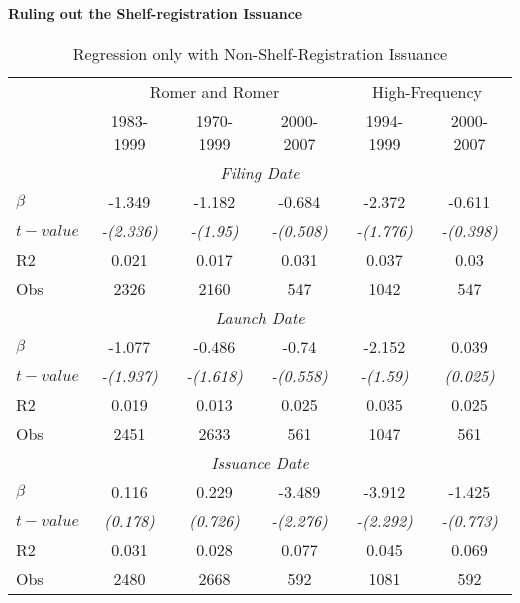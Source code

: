 \documentclass[11pt]{article}
\begin{document}
\paragraph{Ruling out the Shelf-registration Issuance}
\begin{table}[htbp]
	\centering
	\caption{Regression only with Non-Shelf-Registration Issuance}
	\begin{tabular}{lccccc}
		\toprule
		& \multicolumn{3}{c}{Romer and Romer} & \multicolumn{2}{c}{High-Frequency} \\
		& 1983-1999 & 1970-1999 & 2000-2007 & 1994-1999 & 2000-2007 \\
		\midrule
		\multicolumn{6}{c}{\textit{Filing Date}} \\
		$ \beta $ & -1.349 & -1.182 & -0.684 & -2.372 & -0.611 \\
		$ t-value $ & \textit{-(2.336)} & \textit{-(1.95)} & \textit{-(0.508)} & \textit{-(1.776)} & \textit{-(0.398)} \\
		R2    & 0.021 & 0.017 & 0.031 & 0.037 & 0.03 \\
		Obs   & 2326  & 2160  & 547   & 1042  & 547 \\
		\midrule
		\multicolumn{6}{c}{\textit{Launch Date}} \\
		$ \beta $ & -1.077 & -0.486 & -0.74 & -2.152 & 0.039 \\
		$ t-value $ & \textit{-(1.937)} & \textit{-(1.618)} & \textit{-(0.558)} & \textit{-(1.59)} & \textit{(0.025)} \\
		R2    & 0.019 & 0.013 & 0.025 & 0.035 & 0.025 \\
		Obs   & 2451  & 2633  & 561   & 1047  & 561 \\
		\midrule
		\multicolumn{6}{c}{\textit{Issuance Date}} \\
		$ \beta $ & 0.116 & 0.229 & -3.489 & -3.912 & -1.425 \\
		$ t-value $ & \textit{(0.178)} & \textit{(0.726)} & \textit{-(2.276)} & \textit{-(2.292)} & \textit{-(0.773)} \\
		R2    & 0.031 & 0.028 & 0.077 & 0.045 & 0.069 \\
		Obs   & 2480  & 2668  & 592   & 1081  & 592 \\
		\bottomrule
	\end{tabular}%
	\label{tab:addlabel}%
\end{table}%
\newpage
\begin{spacing}{1}


\end{spacing}


\newpage
\appendix
\renewcommand{\thefigure}{A\arabic{figure}}
\setcounter{figure}{0}
\renewcommand{\thetable}{A\arabic{table}} 
\setcounter{table}{0}
\renewcommand{\theequation}{A\arabic{equation}} 
\setcounter{equation}{0}
\end{document}
